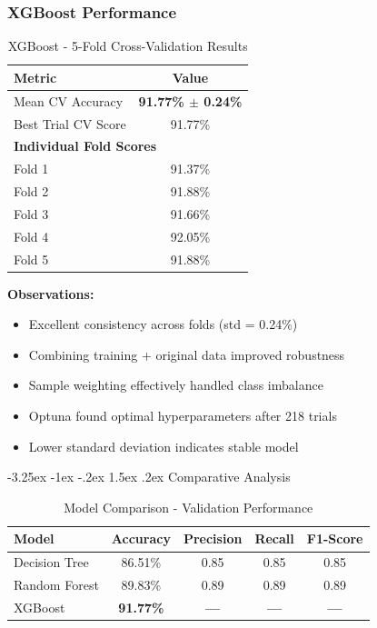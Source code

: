 \documentclass[12pt,a4paper]{article}
\makeatletter
\renewcommand{\subsection}{\@startsection{subsection}{2}{\z@}%
                                   {-3.25ex \@plus -1ex \@minus -.2ex}%
                                   {1.5ex \@plus .2ex}%
                                   {\normalfont\large\bfseries\vspace{0.3\baselineskip}}}
\makeatother
\begin{document}
\subsubsection{XGBoost Performance}

\begin{table}[H]
\centering
\caption{XGBoost - 5-Fold Cross-Validation Results}
\begin{tabular}{lc}
\toprule
\textbf{Metric} & \textbf{Value} \\
\midrule
Mean CV Accuracy & \textbf{91.77\% $\pm$ 0.24\%} \\
Best Trial CV Score & 91.77\% \\
\midrule
\multicolumn{2}{l}{\textbf{Individual Fold Scores}} \\
\midrule
Fold 1 & 91.37\% \\
Fold 2 & 91.88\% \\
Fold 3 & 91.66\% \\
Fold 4 & 92.05\% \\
Fold 5 & 91.88\% \\
\bottomrule
\end{tabular}
\end{table}

\textbf{Observations:}
\begin{itemize}
    \item Excellent consistency across folds (std = 0.24\%)
    \item Combining training + original data improved robustness
    \item Sample weighting effectively handled class imbalance
    \item Optuna found optimal hyperparameters after 218 trials
    \item Lower standard deviation indicates stable model
\end{itemize}

\subsection{Comparative Analysis}

\begin{table}[H]
\centering
\caption{Model Comparison - Validation Performance}
\begin{tabular}{lcccc}
\toprule
\textbf{Model} & \textbf{Accuracy} & \textbf{Precision} & \textbf{Recall} & \textbf{F1-Score} \\
\midrule
Decision Tree & 86.51\% & 0.85 & 0.85 & 0.85 \\
Random Forest & 89.83\% & 0.89 & 0.89 & 0.89 \\
XGBoost & \textbf{91.77\%} & \textbf{---} & \textbf{---} & \textbf{---} \\
\bottomrule
\end{tabular}
\end{table}
\end{document}
